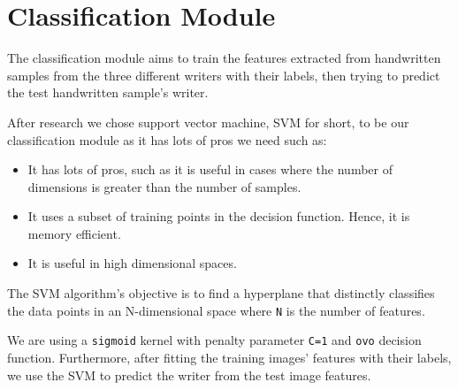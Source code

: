\section{Classification Module}
The classification module aims to train the features extracted from handwritten samples from the three different writers with their labels, then trying to predict the test handwritten sample's writer.

After research we chose support vector machine, SVM for short, to be our classification module as it has lots of pros we need such as:
\begin{itemize}
    \item It has lots of pros, such as it is useful in cases where the number of dimensions is greater than the number of samples.
    \item It uses a subset of training points in the decision function. Hence, it is memory efficient.
    \item It is useful in high dimensional spaces.
\end{itemize}

The SVM algorithm's objective is to find a hyperplane that distinctly classifies the data points in an N-dimensional space where \texttt{N} is the number of features.

We are using a \texttt{sigmoid} kernel with penalty parameter \texttt{C=1} and \texttt{ovo} decision function.
Furthermore, after fitting the training images' features with their labels, we use the SVM to predict the writer from the test image features.
